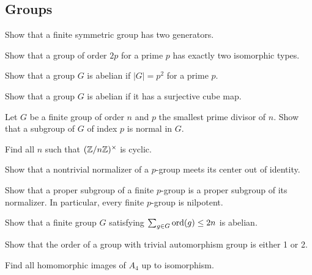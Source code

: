 \documentclass[12pt]{article}
\begin{document}
	\subsection{Groups}

	\begin{prb}
	Show that a finite symmetric group has two generators.
	\end{prb}

	\begin{prb}
	Show that a group of order $2p$ for a prime $p$ has exactly two isomorphic types.
	\end{prb}

	\begin{prb}
	Show that a group $G$ is abelian if $|G|=p^2$ for a prime $p$.
	\end{prb}

	\begin{prb}
	Show that a group $G$ is abelian if it has a surjective cube map.
	\end{prb}

	\begin{prb}
	Let $G$ be a finite group of order $n$ and $p$ the smallest prime divisor of $n$. Show that a subgroup of $G$ of index $p$ is normal in $G$.
	\end{prb}

	\begin{prb}
	Find all $n$ such that $(\mathbb{Z}/n\mathbb{Z})^\times$ is cyclic.
	\end{prb}

	\begin{prb}
	Show that a nontrivial normalizer of a $p$-group meets its center out of identity.
	\end{prb}

	\begin{prb}
	Show that a proper subgroup of a finite $p$-group is a proper subgroup of its normalizer. In particular, every finite $p$-group is nilpotent.
	\end{prb}

	\begin{prb}
	Show that a finite group $G$ satisfying $\sum_{g\in G}\operatorname{ord}(g)\le2n$ is abelian.
	\end{prb}

	\begin{prb}
	Show that the order of a group with trivial automorphism group is either 1 or 2.
	\end{prb}

	\begin{prb}
	Find all homomorphic images of $A_4$ up to isomorphism.
	\end{prb}
\end{document}
